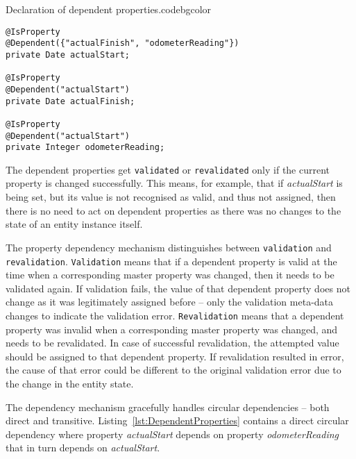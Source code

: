   \begin{code}{Declaration of dependent properties.}{\label{lst:DependentProperties}}{codebgcolor}
    \begin{lstlisting}
@IsProperty
@Dependent({"actualFinish", "odometerReading"})
private Date actualStart;

@IsProperty
@Dependent("actualStart")
private Date actualFinish;

@IsProperty
@Dependent("actualStart")
private Integer odometerReading;
    \end{lstlisting}
  \end{code}

  The dependent properties get \texttt{validated} or \texttt{revalidated} only if the current property is changed successfully.
  This means, for example, that if \emph{actualStart} is being set, but its value is not recognised as valid, and thus not assigned, then there is no need to act on dependent properties as there was no changes to the state of an entity instance itself.
  
  The property dependency mechanism distinguishes between \texttt{validation} and \texttt{revalidation}.  
  \texttt{Validation} means that if a dependent property is valid at the time when a corresponding master property was changed, then it needs to be validated again.
  If validation fails, the value of that dependent property does not change as it was legitimately assigned before -- only the validation meta-data changes to indicate the validation error.
  \texttt{Revalidation} means that a dependent property was invalid when a corresponding master property was changed, and needs to be revalidated.
  In case of successful revalidation, the attempted value should be assigned to that dependent property.
  If revalidation resulted in error, the cause of that error could be different to the original validation error due to the change in the entity state.
  
  The dependency mechanism gracefully handles circular dependencies -- both direct and transitive.
  Listing~\ref{lst:DependentProperties} contains a direct circular dependency where property \emph{actualStart} depends on property \emph{odometerReading} that in turn depends on \emph{actualStart}.

